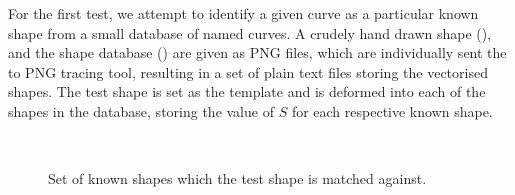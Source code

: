 \documentclass[a4paper, 12pt]{article}
\begin{document}
For the first test, we attempt to identify a given curve as a particular known
shape from a small database of named curves. A crudely hand drawn shape
(), and the shape database () are given as PNG
files, which are individually sent the to PNG tracing tool, resulting in a set
of plain text files storing the vectorised shapes. The test shape is set as the
template  and is deformed into each of the shapes in the database, storing
the value of $S$ for each respective known shape.
\begin{figure}[!h]
  \centering
  \,
  \caption[Database of known shapes]{Set of known shapes which the test shape is matched against.}
  \label{fig:shapedb}
\end{figure}
\end{document}
